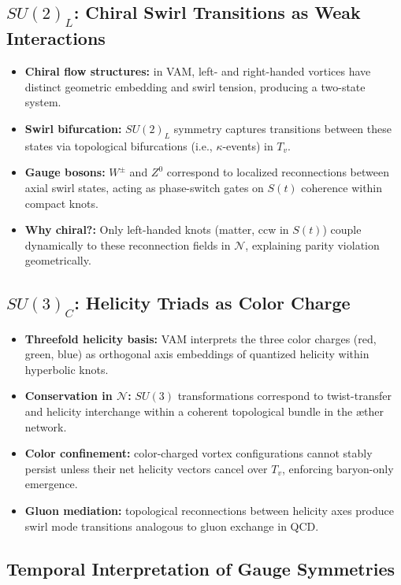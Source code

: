 \documentclass[12pt]{article}
\begin{document}
\subsection{$SU(2)_L$: Chiral Swirl Transitions as Weak Interactions}

\begin{itemize}
    \item \textbf{Chiral flow structures:} in VAM, left- and right-handed vortices have distinct geometric embedding and swirl tension, producing a two-state system.
    \item \textbf{Swirl bifurcation:} $SU(2)_L$ symmetry captures transitions between these states via topological bifurcations (i.e., $\kappa$-events) in $T_v$.
    \item \textbf{Gauge bosons:} $W^\pm$ and $Z^0$ correspond to localized reconnections between axial swirl states, acting as phase-switch gates on $S(t)$ coherence within compact knots.
    \item \textbf{Why chiral?:} Only left-handed knots (matter, ccw in $S(t)$) couple dynamically to these reconnection fields in $\mathcal{N}$, explaining parity violation geometrically.
\end{itemize}

\subsection{$SU(3)_C$: Helicity Triads as Color Charge}

\begin{itemize}
    \item \textbf{Threefold helicity basis:} VAM interprets the three color charges (red, green, blue) as orthogonal axis embeddings of quantized helicity within hyperbolic knots.
    \item \textbf{Conservation in $\mathcal{N}$:} $SU(3)$ transformations correspond to twist-transfer and helicity interchange within a coherent topological bundle in the æther network.
    \item \textbf{Color confinement:} color-charged vortex configurations cannot stably persist unless their net helicity vectors cancel over $T_v$, enforcing baryon-only emergence.
    \item \textbf{Gluon mediation:} topological reconnections between helicity axes produce swirl mode transitions analogous to gluon exchange in QCD.
\end{itemize}

\subsection{Temporal Interpretation of Gauge Symmetries}
\end{document}

